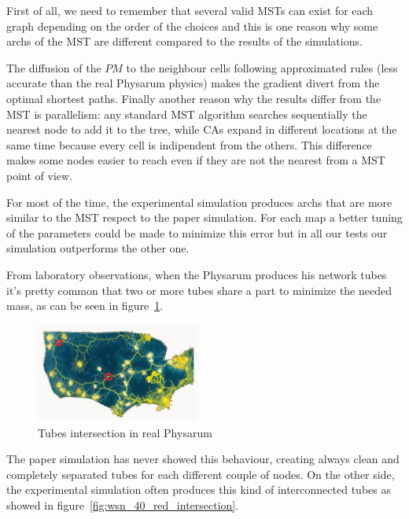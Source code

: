 \par
First of all, we need to remember that several valid MSTs can exist for each graph depending on the order of the choices and this is one reason why some archs of the MST are different compared to the results of the simulations.

\par
The diffusion of the $PM$ to the neighbour cells following approximated rules (less accurate than the real Physarum physics) makes the gradient divert from the optimal shortest paths.
Finally another reason why the results differ from the MST is parallelism: any standard MST algorithm searches sequentially the nearest node to add it to the tree, while CAs expand in different locations at the same time because every cell is indipendent from the others. This difference makes some nodes easier to reach even if they are not the nearest from a MST point of view.

\par
For most of the time, the experimental simulation produces archs that are more similar to the MST respect to the paper simulation. For each map a better tuning of the parameters could be made to minimize this error but in all our tests our simulation outperforms the other one.

\par
From laboratory observations, when the Physarum produces his network tubes it's pretty common that two or more tubes share a part to minimize the needed mass, as can be seen in figure~\ref{fig:tube_intersection_red}.

\begin{figure}[H]
  \centering
    \includegraphics[width=0.48\textwidth]{tube_intersection_red}%
    
  \caption{Tubes intersection in real Physarum}
  \label{fig:tube_intersection_red}
\end{figure}

\par
The paper simulation has never showed this behaviour, creating always clean and completely separated tubes for each different couple of nodes. On the other side, the experimental simulation often produces this kind of interconnected tubes as showed in figure~\ref{fig:wsn_40_red_intersection}.

